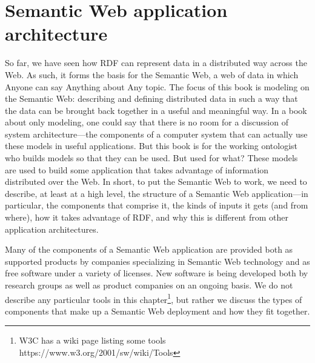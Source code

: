 \chapter{Semantic Web application architecture}
\label{ch4}

So far, we have seen how RDF can represent data in a distributed way
across the Web. As such, it forms the basis for the Semantic Web, a web
of data in which Anyone can say Anything about Any topic. The focus of
this book is modeling on the Semantic Web: describing and defining
distributed data in such a way that the data can be brought back
together in a useful and meaningful way. In a book about only modeling,
one could say that there is no room for a discussion of system
architecture---the components of a computer system that can actually use
these models in useful applications. But this book is for the working
ontologist who builds models so that they can be used. But used for
what? These models are used to build some application that takes
advantage of information distributed over the Web. In short, to put the
Semantic Web to work, we need to describe, at least at a high level, the
structure of a Semantic Web application---in particular, the components
that comprise it, the kinds of inputs it gets (and from where), how it
takes advantage of RDF, and why this is different from other application
architectures.

Many of the components of a Semantic Web application are provided both
as supported products by companies specializing in Semantic Web
technology and as free software under a variety of licenses. New
software is being developed both by research groups as well as product
companies on an ongoing basis. We do not describe any particular tools
in this chapter\footnote{W3C has a wiki page listing some tools
  {https://www.w3.org/2001/sw/wiki/Tools}}, but rather we discuss the
types of components that make up a Semantic Web deployment and how they
fit together.

